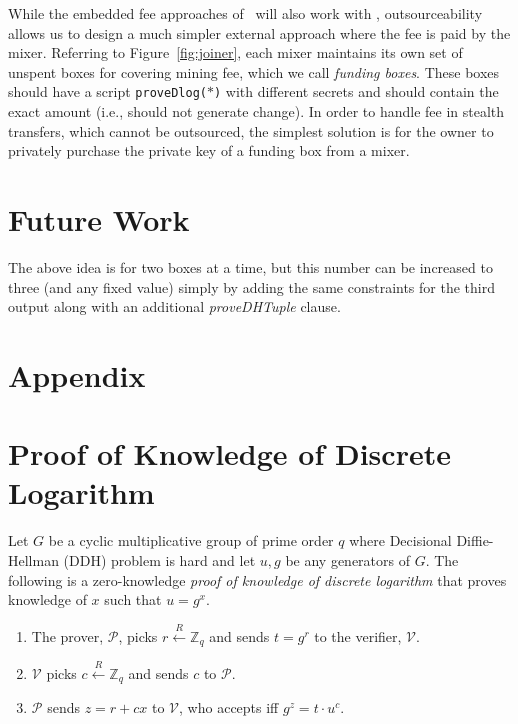 \documentclass[runningheads]{llncs}
\begin{document}
While the embedded fee approaches of~\cite{zerojoin} will also work with \algname, outsourceability allows us to design a much simpler external approach where the fee is paid by the mixer. Referring to Figure~\ref{fig:joiner}, each mixer maintains its own set of unspent boxes for covering mining fee, which we call {\em funding boxes}. These boxes should have a script \texttt{proveDlog($*$)} with different secrets and should contain the exact amount (i.e., should not generate change). In order to handle fee in stealth transfers, which cannot be outsourced, the simplest solution is for the owner to privately purchase the private key of a funding box from a mixer.


\section{Future Work}

The above idea is for two boxes at a time, but this number can be increased to three (and any fixed value) simply by adding the same constraints for the third output along with an additional {\em proveDHTuple} clause.




\appendix

\section*{Appendix}

\section{Proof of Knowledge of Discrete Logarithm}
\label{provedlog}

Let $G$ be a cyclic multiplicative group of prime order $q$ where Decisional Diffie-Hellman (DDH) problem is hard and let $u, g$ be any generators of $G$.
The following is a zero-knowledge {\em proof of knowledge of discrete logarithm} that proves knowledge of $x$ such that $u = g^x$.
\begin{enumerate}
\item The prover, $\mathcal{P}$, picks $r \stackrel{R}{\leftarrow} \mathbb{Z}_q$ and sends $t = g^r$ to the verifier, $\mathcal{V}$.
\item $\mathcal{V}$ picks $c \stackrel{R}{\leftarrow} \mathbb{Z}_q$ and sends $c$ to $\mathcal{P}$.
\item $\mathcal{P}$ sends $z = r + cx$ to $\mathcal{V}$, who accepts iff ${g}^z = t\cdot {u}^c$.
\end{enumerate}
\end{document}
